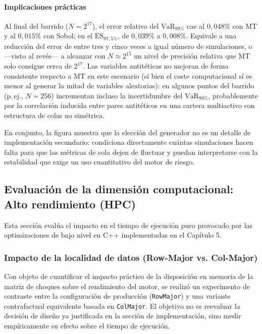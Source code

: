 \documentclass[11pt]{article}
\begin{document}
\paragraph{Implicaciones prácticas}
Al final del barrido ($N=2^{17}$), el error relativo del $\text{VaR}_{99\%}$ cae al $0{,}048\%$ con MT y al $0{,}015\%$ con Sobol; en el $\text{ES}_{97{,}5\%}$, de $0{,}039\%$ a $0{,}008\%$. Equivale a una reducción del error de entre tres y cinco veces a igual número de simulaciones, o —visto al revés— a alcanzar con $N \approx 2^{15}$ un nivel de precisión relativa que MT solo consigue cerca de $2^{17}$. Las variables antitéticas no mejoran de forma consistente respecto a MT en este escenario (si bien el coste computacional sí es menor al generar la mitad de variables aleatorias): en algunos puntos del barrido (p.\,ej., $N=256$) incrementan incluso la incertidumbre del $\text{VaR}_{99\%}$, probablemente por la correlación inducida entre pares antitéticos en una cartera multiactivo con estructura de colas no simétrica.

En conjunto, la figura muestra que la elección del generador no es un detalle de implementación secundario: condiciona directamente cuántas simulaciones hacen falta para que las métricas de cola dejen de fluctuar y puedan interpretarse con la estabilidad que exige un uso cuantitativo del motor de riesgo.

\subsection{Evaluación de la dimensión computacional: Alto rendimiento (HPC)}

Esta sección evalúa el impacto en el tiempo de ejecución puro provocado por las optimizaciones de bajo nivel en C++ implementadas en el Capítulo 5.

\subsubsection{Impacto de la localidad de datos (Row-Major vs. Col-Major)}

Con objeto de cuantificar el impacto práctico de la disposición en memoria de la matriz de choques sobre el rendimiento del motor, se realizó un experimento de contraste entre la configuración de producción (\texttt{RowMajor}) y una variante contrafactual equivalente basada en \texttt{ColMajor}. El objetivo no es reevaluar la decisión de diseño ya justificada en la sección de implementación, sino medir empíricamente su efecto sobre el tiempo de ejecución.
\end{document}

